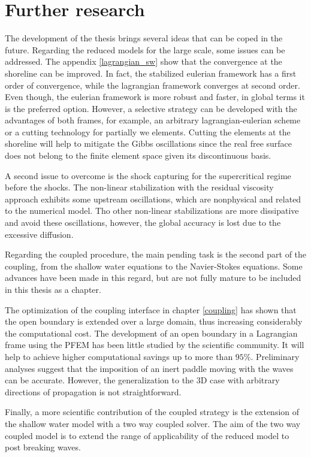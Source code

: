 
\section{Further research}


The development of the thesis brings several ideas that can be coped in the future.
Regarding the reduced models for the large scale, some issues can be addressed. The appendix \ref{lagrangian_sw} show that the convergence at the shoreline can be improved. In fact, the stabilized eulerian framework has a first order of convergence, while the lagrangian framework converges at second order. Even though, the eulerian framework is more robust and faster, in global terms it is the preferred option. However, a selective strategy can be developed with the advantages of both frames, for example, an arbitrary lagrangian-eulerian scheme or a cutting technology for partially we elements. Cutting the elements at the shoreline will help to mitigate the Gibbs oscillations since the real free surface does not belong to the finite element space given its discontinuous basis.

A second issue to overcome is the shock capturing for the supercritical regime before the shocks. The non-linear stabilization with the residual viscosity approach exhibits some upstream oscillations, which are nonphysical and related to the numerical model. Tho other non-linear stabilizations are more dissipative and avoid these oscillations, however, the global accuracy is lost due to the excessive diffusion.

Regarding the coupled procedure, the main pending task is the second part of the coupling, from the shallow water equations to the Navier-Stokes equations. Some advances have been made in this regard, but are not fully mature to be included in this thesis as a chapter.

The optimization of the coupling interface in chapter \ref{coupling} has shown that the open boundary is extended over a large domain, thus increasing considerably the computational cost. The development of an open boundary in a Lagrangian frame using the PFEM has been little studied by the scientific community. It will help to achieve higher computational savings up to more than $95\%$. Preliminary analyses suggest that the imposition of an inert paddle moving with the waves can be accurate. However, the generalization to the 3D case with arbitrary directions of propagation is not straightforward.

Finally, a more scientific contribution of the coupled strategy is the extension of the shallow water model with a two way coupled solver. The aim of the two way coupled model is to extend the range of applicability of the reduced model to post breaking waves.

